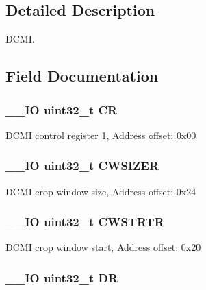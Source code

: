 \subsection{Detailed Description}
D\-C\-M\-I. 

\subsection{Field Documentation}
\hypertarget{struct_d_c_m_i___type_def_ab40c89c59391aaa9d9a8ec011dd0907a}{
\subsubsection[{C\-R}]{\setlength{\rightskip}{0pt plus 5cm}\-\_\-\-\_\-\-I\-O uint32\-\_\-t C\-R}}\label{struct_d_c_m_i___type_def_ab40c89c59391aaa9d9a8ec011dd0907a}
D\-C\-M\-I control register 1, Address offset\-: 0x00 \hypertarget{struct_d_c_m_i___type_def_aa3ccc5d081bbee3c61ae9aa5e0c83af9}{
\subsubsection[{C\-W\-S\-I\-Z\-E\-R}]{\setlength{\rightskip}{0pt plus 5cm}\-\_\-\-\_\-\-I\-O uint32\-\_\-t C\-W\-S\-I\-Z\-E\-R}}\label{struct_d_c_m_i___type_def_aa3ccc5d081bbee3c61ae9aa5e0c83af9}
D\-C\-M\-I crop window size, Address offset\-: 0x24 \hypertarget{struct_d_c_m_i___type_def_a919b70dd8762e44263a02dfbafc7b8ce}{
\subsubsection[{C\-W\-S\-T\-R\-T\-R}]{\setlength{\rightskip}{0pt plus 5cm}\-\_\-\-\_\-\-I\-O uint32\-\_\-t C\-W\-S\-T\-R\-T\-R}}\label{struct_d_c_m_i___type_def_a919b70dd8762e44263a02dfbafc7b8ce}
D\-C\-M\-I crop window start, Address offset\-: 0x20 \hypertarget{struct_d_c_m_i___type_def_a3df0d8dfcd1ec958659ffe21eb64fa94}{
\subsubsection[{D\-R}]{\setlength{\rightskip}{0pt plus 5cm}\-\_\-\-\_\-\-I\-O uint32\-\_\-t D\-R}}\label{struct_d_c_m_i___type_def_a3df0d8dfcd1ec958659ffe21eb64fa94}
